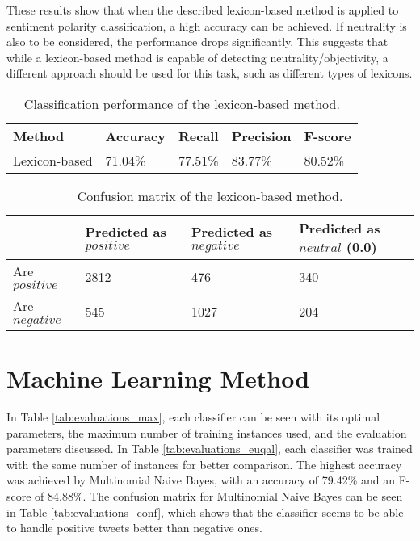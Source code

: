 These results show that when the described lexicon-based method is applied to sentiment polarity classification, a high accuracy can be achieved. If neutrality is also to be considered, the performance drops significantly. This suggests that while a lexicon-based method is capable of detecting neutrality/objectivity, a different approach should be used for this task, such as different types of lexicons.

\begin{table}
\caption{Classification performance of the lexicon-based method.}
\label{tab:eval_lex}
\centering
\begin{tabular}{ |p{3cm}||p{2cm}|p{2cm}|p{2cm}|p{2cm}|}
 \hline
 Method &          Accuracy &      Recall &     Precision& F-score \\
  \hline
 Lexicon-based & 71.04\% & 77.51\% & 83.77\% & 80.52\% \\
 \hline
 \end{tabular}
 
\end{table}
\begin{table}
\centering
\caption{Confusion matrix of the lexicon-based method.}
\begin{tabular}{ |p{3cm}||p{3cm}|p{3cm}|p{3cm}| }
 \hline
  &          Predicted as $positive$ &Predicted as $negative$  & Predicted as $neutral$ (0.0)\\
 \hline
 Are $positive$        & 2812&            476 & 340\\
  \hline
 Are $negative$  &545&                     1027 & 204\\
 \hline

\end{tabular}
\label{tab:evaluations_conf_lex}
\end{table}


\section{Machine Learning Method}

In Table \ref{tab:evaluations_max}, each classifier can be seen with its optimal parameters, the maximum number of training instances used, and the evaluation parameters discussed. In Table \ref{tab:evaluations_euqal}, each classifier was trained with the same number of instances for better comparison. The highest accuracy was achieved by Multinomial Naive Bayes, with an accuracy of 79.42\% and an F-score of 84.88\%. The confusion matrix for Multinomial Naive Bayes can be seen in Table \ref{tab:evaluations_conf}, which shows that the classifier seems to be able to handle positive tweets better than negative ones.

